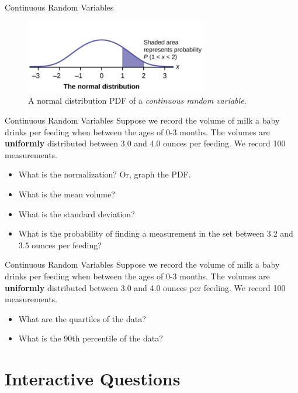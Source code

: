 \documentclass{beamer}
\begin{document}
\begin{frame}{Continuous Random Variables}
\begin{figure}
\centering
\includegraphics[width=8cm]{figures/normal.png}
\caption{\label{fig:norm} A normal distribution PDF of a \textit{continuous random variable.}}
\end{figure}
\end{frame}

\begin{frame}{Continuous Random Variables}
Suppose we record the volume of milk a baby drinks per feeding when between the ages of 0-3 months.  The volumes are \textbf{\alert{uniformly}} distributed between 3.0 and 4.0 ounces per feeding.  We record 100 measurements.
\begin{itemize}
\item What is the normalization?  Or, graph the PDF.
\item What is the mean volume?
\item What is the standard deviation?
\item What is the probability of finding a measurement in the set between 3.2 and 3.5 ounces per feeding?
\end{itemize}
\end{frame}

\begin{frame}{Continuous Random Variables}
Suppose we record the volume of milk a baby drinks per feeding when between the ages of 0-3 months.  The volumes are \textbf{\alert{uniformly}} distributed between 3.0 and 4.0 ounces per feeding.  We record 100 measurements.
\begin{itemize}
\item What are the quartiles of the data?
\item What is the 90th percentile of the data?
\end{itemize}
\end{frame}

\section{Interactive Questions}
\end{document}
